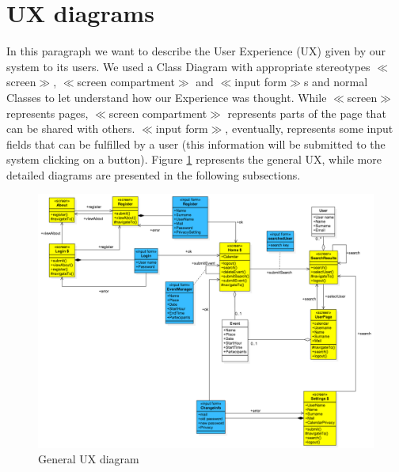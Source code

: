 \documentclass[10pt,a4paper,titlepage]{article}
\begin{document}
\section{UX diagrams}
\label{sec:UXdiagrams}
In this paragraph we want to describe the User Experience (UX) given by our system to its users. We used a Class Diagram with appropriate stereotypes $\ll$screen$\gg$, $\ll$screen compartment$\gg$ and $\ll$input form$\gg$s and normal Classes to let understand how our Experience was thought. While $\ll$screen$\gg$ represents pages, $\ll$screen compartment$\gg$ represents parts of the page that can be shared with others. $\ll$input form$\gg$, eventually, represents some input fields that can be fulfilled by a user (this information will be submitted to the system clicking on a button).
Figure \ref{fig:ux} represents the general UX, while more detailed diagrams are presented in the following subsections.
\begin{figure}[h]
\centering
\includegraphics[width=\linewidth]{./images/ux}
\caption[Ux]{General UX diagram}
\label{fig:ux}
\end{figure}
\end{document}
